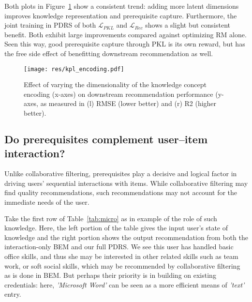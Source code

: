 Both plots in Figure~\ref{fig:klatent_dim} show a consistent trend: adding more latent dimensions improves knowledge representation and prerequisite capture.
Furthermore, the joint training in PDRS of both $\mathcal{L}_{PKL}$ and $\mathcal{L}_{Rec}$ shows a  slight but consistent benefit.  Both exhibit large improvements compared against optimizing RM alone. 
Seen this way, good prerequisite capture through PKL is its own reward, but has the free side effect of benefitting downstream recommendation as well.
\begin{figure}[h!]
\setlength{\belowcaptionskip}{-0.2cm}
\centering
\texttt{[image: res/kpl\_encoding.pdf]}
\caption{Effect of varying the dimensionality of the knowledge concept encoding (x-axes) on downstream recommendation performance (y-axes, as measured in (l) RMSE (lower better) and (r) R2 (higher better).}
\label{fig:klatent_dim}
\end{figure}

\subsection{Do prerequisites complement user--item interaction?}

Unlike collaborative filtering, prerequisites play a decisive and logical factor in driving users' sequential interactions with items.  While collaborative filtering may find quality recommendations, such recommendations may not account for the immediate needs of the user. 

Take the first row of Table~\ref{tab:micro} as in example of the role of such knowledge.  Here, the left portion of the table gives the input user's state of knowledge and the right portion shows the output recommendation from both the interaction-only BEM and our full PDRS.  
We see this user has handled basic office skills, and thus she may be interested in other related skills such as team work, or soft social skills, which may be recommended by collaborative filtering as is done in BEM.  But perhaps their priority is in building on existing credentials: here, \textit{'Microsoft Word'} can be seen as a more efficient means of  \textit{'text'} entry.

